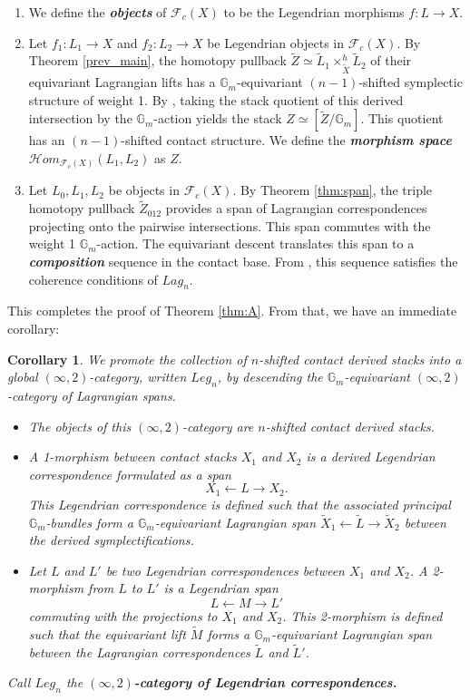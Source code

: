 \documentclass[reqno]{amsart}
\newcommand{\bfem}[1]{\textbf{\textit{#1}}}
\newcommand{\Gm}{\mathbb{G}_m}
\newtheorem{corollary}[theorem]{Corollary}
\begin{document}
\begin{enumerate}\itemsep=8pt
    \item We define the \bfem{objects} of $\mathcal{F}_{c}(X)$ to be the Legendrian morphisms $f \colon L \to X$.
    \item Let $f_{1} \colon L_{1} \to X$ and $f_{2} \colon L_{2} \to X$ be Legendrian objects in $\mathcal{F}_{c}(X)$. 
    By Theorem \ref{prev_main}, the homotopy pullback $\widetilde{Z} \simeq \widetilde{L}_{1} \times_{\widetilde{X}}^{h} \widetilde{L}_{2}$ of their equivariant Lagrangian lifts has a $\Gm$-equivariant $(n-1)$-shifted symplectic structure of weight 1.
    By \cite[Theorem 3.7]{IzbudakBerktav}, taking the stack quotient of this derived intersection by the $\Gm$-action yields the stack $Z \simeq [\widetilde{Z}/\Gm]$. This quotient has an $(n-1)$-shifted contact structure. We define the \bfem{morphism space} $\mathcal{H}om_{\mathcal{F}_{c}(X)}(L_{1}, L_{2})$ as $Z$.
    \item Let $L_{0}, L_{1}, L_{2}$ be objects in $\mathcal{F}_{c}(X)$.
    By Theorem \ref{thm:span}, the triple homotopy pullback $\widetilde{Z}_{012}$ provides a span of Lagrangian correspondences projecting onto the pairwise intersections. This span commutes with the weight 1 $\Gm$-action. The equivariant descent translates this span to a \bfem{composition} sequence in the contact base. From \cite[Theorem 2.7]{CHS}, this sequence satisfies the coherence conditions of $Lag_{n}$.
\end{enumerate}This completes the proof of Theorem \ref{thm:A}. From that, we have an immediate corollary:

\begin{corollary}\label{defn:Leg_n}
We promote the collection of $n$-shifted contact derived stacks into a global $(\infty, 2)$-category, written $Leg_n$, by descending the $\Gm$-equivariant $(\infty, 2)$-category of Lagrangian spans. \begin{itemize}
    \item The \emph{objects} of this $(\infty, 2)$-category are $n$-shifted contact derived stacks.
    \item A \emph{1-morphism} between contact stacks $X_{1}$ and $X_{2}$ is a derived Legendrian correspondence formulated as a span \[ X_{1} \leftarrow L \rightarrow X_{2}. \]
This Legendrian correspondence is defined such that the associated principal $\Gm$-bundles form a $\Gm$-equivariant Lagrangian span $\widetilde{X}_{1} \leftarrow \widetilde{L} \rightarrow \widetilde{X}_{2}$ between the derived symplectifications.
    \item Let $L$ and $L'$ be two Legendrian correspondences between $X_{1}$ and $X_{2}$. A \emph{2-morphism} from $L$ to $L'$ is a Legendrian span \[ L \leftarrow M \rightarrow L' \] commuting with the projections to $X_{1}$ and $X_{2}$. This 2-morphism is defined such that the equivariant lift $\widetilde{M}$ forms a $\Gm$-equivariant Lagrangian span between the Lagrangian correspondences $\widetilde{L}$ and $\widetilde{L}'$.
\end{itemize} Call $Leg_n$ the \bfem{$(\infty,2)$-category  of Legendrian correspondences.}  
\end{corollary}
\end{document}

